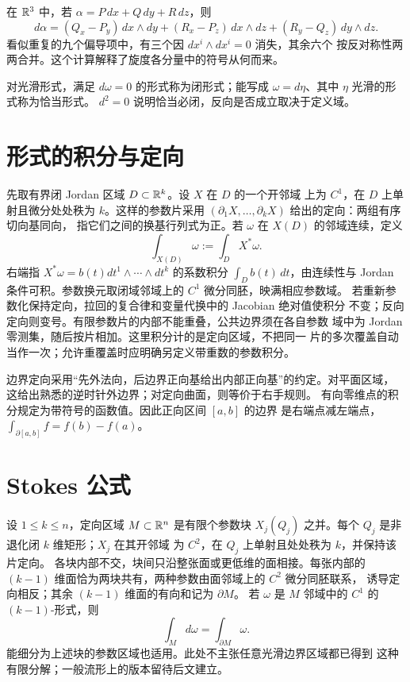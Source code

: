 在 $\mathbb{R}^3$ 中，若 $\alpha=P\,dx+Q\,dy+R\,dz$，则
\[
 d\alpha
 =(Q_x-P_y)\,dx\wedge dy
 +(R_x-P_z)\,dx\wedge dz
 +(R_y-Q_z)\,dy\wedge dz.
\]
看似重复的九个偏导项中，有三个因 $dx^i\wedge dx^i=0$ 消失，其余六个
按反对称性两两合并。这个计算解释了旋度各分量中的符号从何而来。

对光滑形式，满足 $d\omega=0$ 的形式称为闭形式；能写成
$\omega=d\eta$、其中 $\eta$ 光滑的形式称为恰当形式。
$d^2=0$ 说明恰当必闭，反向是否成立取决于定义域。

\section{形式的积分与定向}

先取有界闭 Jordan 区域 $D\subset\mathbb{R}^k$。设 $X$ 在 $D$ 的一个开邻域
上为 $C^1$，在 $D$ 上单射且微分处处秩为 $k$。这样的参数片采用
$(\partial_1X,\ldots,\partial_kX)$ 给出的定向：两组有序切向基同向，
指它们之间的换基行列式为正。若 $\omega$ 在 $X(D)$ 的邻域连续，定义
\[
 \int_{X(D)}\omega:=\int_DX^*\omega.
\]
右端指 $X^*\omega=b(t)dt^1\wedge\cdots\wedge dt^k$ 的系数积分
$\int_D b(t)\,dt$，由连续性与 Jordan 条件可积。参数换元取闭域邻域上的
$C^1$ 微分同胚，映满相应参数域。
若重新参数化保持定向，拉回的复合律和变量代换中的 Jacobian 绝对值使积分
不变；反向定向则变号。有限参数片的内部不能重叠，公共边界须在各自参数
域中为 Jordan 零测集，随后按片相加。这里积分计的是定向区域，不把同一
片的多次覆盖自动当作一次；允许重覆盖时应明确另定义带重数的参数积分。

边界定向采用“先外法向，后边界正向基给出内部正向基”的约定。对平面区域，
这给出熟悉的逆时针外边界；对定向曲面，则等价于右手规则。
有向零维点的积分规定为带符号的函数值。因此正向区间 $[a,b]$ 的边界
是右端点减左端点，$\int_{\partial[a,b]}f=f(b)-f(a)$。

\section{Stokes 公式}

\begin{theorem}
\label{thm:stokes-differential-forms-euclidean}
设 $1\le k\le n$，定向区域 $M\subset\mathbb{R}^n$ 是有限个参数块
$X_j(Q_j)$ 之并。每个 $Q_j$ 是非退化闭 $k$ 维矩形；$X_j$ 在其开邻域
为 $C^2$，在 $Q_j$ 上单射且处处秩为 $k$，并保持该片定向。
各块内部不交，块间只沿整张面或更低维的面相接。每张内部的
$(k-1)$ 维面恰为两块共有，两种参数由面邻域上的 $C^2$ 微分同胚联系，
诱导定向相反；其余 $(k-1)$ 维面的有向和记为 $\partial M$。
若 $\omega$ 是 $M$ 邻域中的 $C^1$ 的 $(k-1)$-形式，则
\[
 \int_Md\omega=\int_{\partial M}\omega.
\]
能细分为上述块的参数区域也适用。此处不主张任意光滑边界区域都已得到
这种有限分解；一般流形上的版本留待后文建立。
\end{theorem}

